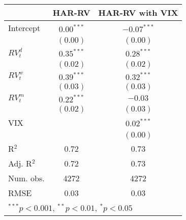 
\begin{tabular}{l c c }
\hline
 & HAR-RV & HAR-RV with VIX \\
\hline
Intercept    & $0.00^{***}$ & $-0.07^{***}$ \\
             & $(0.00)$     & $(0.00)$      \\
$RV_{t}^{d}$ & $0.35^{***}$ & $0.28^{***}$  \\
             & $(0.02)$     & $(0.02)$      \\
$RV_{t}^{w}$ & $0.39^{***}$ & $0.32^{***}$  \\
             & $(0.03)$     & $(0.03)$      \\
$RV_{t}^{m}$ & $0.22^{***}$ & $-0.03$       \\
             & $(0.02)$     & $(0.03)$      \\
VIX          &              & $0.02^{***}$  \\
             &              & $(0.00)$      \\
\hline
R$^2$        & 0.72         & 0.73          \\
Adj. R$^2$   & 0.72         & 0.73          \\
Num. obs.    & 4272         & 4272          \\
RMSE         & 0.03         & 0.03          \\
\hline
\multicolumn{3}{l}{\scriptsize{$^{***}p<0.001$, $^{**}p<0.01$, $^*p<0.05$}}
\end{tabular}

